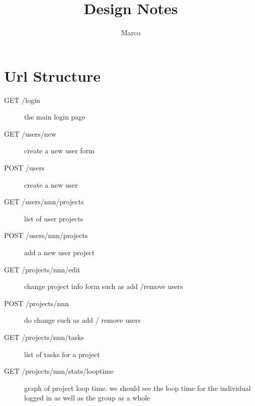 \documentclass{article}
\title{Design Notes}
\author{Marco}
\begin{document}
\maketitle
\tableofcontents
\section{Url Structure}
\begin{description}
\item[GET /login] the main login page
\item[GET /users/new] create a new user form
\item[POST /users] create a new user
\item[GET /users/nnn/projects] list of user projects
\item[POST /users/nnn/projects] add a new user project
\item[GET /projects/nnn/edit] change project info form such as add /remove users
\item[POST /projects/nnn] do change such as add / remove users
\item[GET /projects/nnn/tasks] list of tasks for a project
\item[GET /projects/nnn/stats/looptime] graph of project loop time. we should see the loop time for the individual logged in as well as the group as a whole
\end{description}
\end{document}

